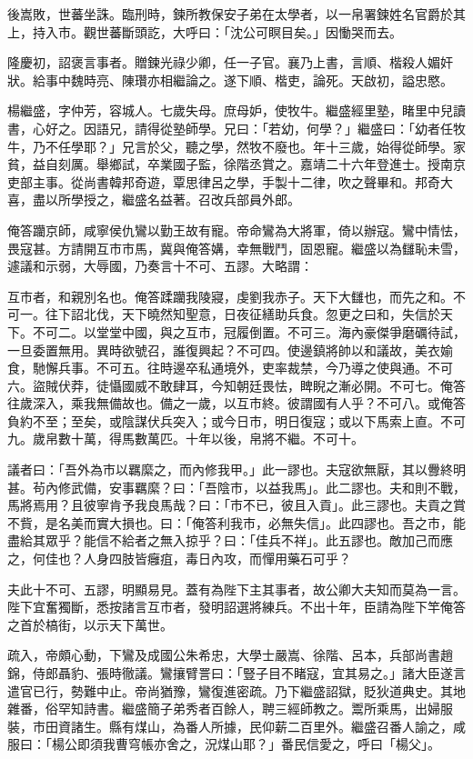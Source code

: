 \begin{pinyinscope}
{{後嵩敗，世蕃坐誅。臨刑時，鍊所教保安子弟在太學者，以一帛署鍊姓名官爵於其上，持入市。觀世蕃斷頭訖，大呼曰：「沈公可瞑目矣。」因慟哭而去。

隆慶初，詔褒言事者。贈鍊光祿少卿，任一子官。襄乃上書，言順、楷殺人媚奸狀。給事中魏時亮、陳瓚亦相繼論之。遂下順、楷吏，論死。天啟初，謚忠愍。

楊繼盛，字仲芳，容城人。七歲失母。庶母妒，使牧牛。繼盛經里塾，睹里中兒讀書，心好之。因語兄，請得從塾師學。兄曰：「若幼，何學？」繼盛曰：「幼者任牧牛，乃不任學耶？」兄言於父，聽之學，然牧不廢也。年十三歲，始得從師學。家貧，益自刻厲。舉鄉試，卒業國子監，徐階丞賞之。嘉靖二十六年登進士。授南京吏部主事。從尚書韓邦奇遊，覃思律呂之學，手製十二律，吹之聲畢和。邦奇大喜，盡以所學授之，繼盛名益著。召改兵部員外郎。

俺答躪京師，咸寧侯仇鸞以勤王故有寵。帝命鸞為大將軍，倚以辦寇。鸞中情怯，畏寇甚。方請開互市市馬，冀與俺答媾，幸無戰鬥，固恩寵。繼盛以為讎恥未雪，遽議和示弱，大辱國，乃奏言十不可、五謬。大略謂：

互市者，和親別名也。俺答蹂躪我陵寢，虔劉我赤子。天下大讎也，而先之和。不可一。往下詔北伐，天下曉然知聖意，日夜征繕助兵食。忽更之曰和，失信於天下。不可二。以堂堂中國，與之互市，冠履倒置。不可三。海內豪傑爭磨礪待試，一旦委置無用。異時欲號召，誰復興起？不可四。使邊鎮將帥以和議故，美衣媮食，馳懈兵事。不可五。往時邊卒私通境外，吏率裁禁，今乃導之使與通。不可六。盜賊伏莽，徒懾國威不敢肆耳，今知朝廷畏怯，睥睨之漸必開。不可七。俺答往歲深入，乘我無備故也。備之一歲，以互市終。彼謂國有人乎？不可八。或俺答負約不至；至矣，或陰謀伏兵突入；或今日市，明日復寇；或以下馬索上直。不可九。歲帛數十萬，得馬數萬匹。十年以後，帛將不繼。不可十。

議者曰：「吾外為市以羈縻之，而內修我甲。」此一謬也。夫寇欲無厭，其以釁終明甚。茍內修武備，安事羈縻？曰：「吾陰市，以益我馬」。此二謬也。夫和則不戰，馬將焉用？且彼寧肯予我良馬哉？曰：「市不已，彼且入貢」。此三謬也。夫貢之賞不貲，是名美而實大損也。曰：「俺答利我市，必無失信」。此四謬也。吾之市，能盡給其眾乎？能信不給者之無入掠乎？曰：「佳兵不祥」。此五謬也。敵加己而應之，何佳也？人身四肢皆癰疽，毒日內攻，而憚用藥石可乎？

夫此十不可、五謬，明顯易見。蓋有為陛下主其事者，故公卿大夫知而莫為一言。陛下宜奮獨斷，悉按諸言互市者，發明詔選將練兵。不出十年，臣請為陛下竿俺答之首於槁街，以示天下萬世。

疏入，帝頗心動，下鸞及成國公朱希忠，大學士嚴嵩、徐階、呂本，兵部尚書趙錦，侍郎聶豹、張時徹議。鸞攘臂詈曰：「豎子目不睹寇，宜其易之。」諸大臣遂言遣官已行，勢難中止。帝尚猶豫，鸞復進密疏。乃下繼盛詔獄，貶狄道典史。其地雜番，俗罕知詩書。繼盛簡子弟秀者百餘人，聘三經師教之。鬻所乘馬，出婦服裝，市田資諸生。縣有煤山，為番人所據，民仰薪二百里外。繼盛召番人諭之，咸服曰：「楊公即須我曹穹帳亦舍之，況煤山耶？」番民信愛之，呼曰「楊父」。

}}
\end{pinyinscope}
